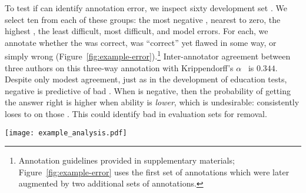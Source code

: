 To test if \irt{} can identify annotation error, we inspect sixty \squad{} development set \itms{}.
We select ten \itms{} from each of these groups: the most negative \discability{}, \discability{} nearest to zero, the highest \discability{}, the least difficult, most difficult, and \irt{} model errors.
For each, we annotate whether the \itm{} was correct, was ``correct'' yet flawed in some way, or simply wrong (Figure~\ref{fig:example-error}).\footnote{
    Annotation guidelines provided in supplementary materials; Figure~\ref{fig:example-error} uses the first set of annotations which were later augmented by two additional sets of annotations.
}
%
Inter-annotator agreement between three authors on this three-way annotation with Krippendorff's $\alpha$~\citep{kripp2004,artstein2008inter} is $0.344$.
%
Despite only modest agreement, just as in the development of education tests, negative \discability{} is predictive of bad \itms{}.
%
When \discability{} is negative, then the probability of getting
the answer right is higher when ability is \emph{lower}, which is
undesirable: \smart{} consistently loses to \dumb{} on those \itms{}.
%
This could identify bad \itms{} in evaluation sets for removal.
\begin{figure*}[t]
    \centering
    \texttt{[image: example\_analysis.pdf]}
    \caption{
        We annotate \squad{} \itms{} by \discability{}, \diff{}, and \irt{} prediction errors.
        For example, one question with negative \discability{} was classified as ``Wrong'' with the explanation that the annotated answer indicates it is  answerable, but the question actually  answerable.
        \Itms{} with negative \discability{} or where \irt{}'s prediction is wrong have a much higher rate of annotation error (``Flawed'' or ``Wrong'').
        Using similar methodology, errors in datasets could be more rapidly identified.
    }
    \label{fig:example-error}
\end{figure*}
